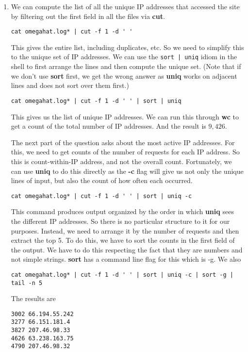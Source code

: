 \documentclass[10pt]{article}
\def\executable#1{\textbf{#1}}
\begin{document}
\begin{enumerate}
\item %
We can compute the list of all the unique IP addresses that accessed the site
by filtering out the first field in all the files via \executable{cut}.
\begin{verbatim}
cat omegahat.log* | cut -f 1 -d ' '
\end{verbatim}
This gives the entire list, including
duplicates, etc.
So we need to simplify this to the unique set of IP addresses.
We can use the \verb+sort | uniq+ idiom in the shell to 
first arrange the lines and then compute the unique set.
(Note that if we don't use \executable{sort} first, we get the wrong
answer as \executable{uniq} works on adjacent lines and does not sort
over them first.)
\begin{verbatim}
cat omegahat.log* | cut -f 1 -d ' ' | sort | uniq 
\end{verbatim}
This gives us the list of unique IP addresses.
We can run this through \executable{wc} to get a count
of the total number of IP addresses.
And the result is $9,426$.

The next part of the question asks about the most active IP addresses.
For this, we need to get counts of the number of requests for each IP address.
So this is count-within-IP  address, and not the overall count.
Fortunately,  we can use \executable{uniq} to do this directly
as the \textbf{-c} flag will give us not only the 
unique lines of input, but also the count of how often each occurred.
\begin{verbatim}
cat omegahat.log* | cut -f 1 -d ' ' | sort | uniq -c
\end{verbatim}

This command produces output organized by the order in which 
\executable{uniq} sees the different IP addresses.
So there is no particular structure to it for our purposes.
Instead, we need to arrange it by the number of requests
and then extract the top 5.
To do this, we have to sort the counts in the first field of the output.
We have to do this respecting the fact that they are numbers and not simple
strings.
\executable{sort} has a command line flag for this which is -g.
We also
\begin{verbatim}
cat omegahat.log* | cut -f 1 -d ' ' | sort | uniq -c | sort -g | tail -n 5
\end{verbatim}
The results are
\begin{verbatim}
3002 66.194.55.242
3277 66.151.181.4
3827 207.46.98.33
4626 63.238.163.75
4790 207.46.98.32
\end{verbatim}


\end{enumerate}
\end{document}
